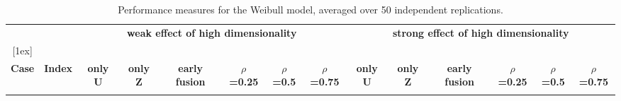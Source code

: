 \begin{table}[!htbp]
\centering
\tiny
\caption{Performance measures for the Weibull model, averaged over 50 independent replications.}
\label{tab:Table2}
\begin{tabular}{c|c|cccccc|cccccc}

\multicolumn{1}{c}{} &
\multicolumn{1}{c}{} &
\multicolumn{6}{c}{\bf weak effect of high dimensionality} &
\multicolumn{6}{c}{\bf strong effect of high dimensionality} \\

[1ex]
\hline

& & & & & & & & & & & & & \\

{\bf Case} &
{\bf Index} &
{\bf only U} &
{\bf only Z} &
{\bf early fusion} &
{\bf $\rho$=0.25} &
{\bf $\rho$=0.5} &
{\bf $\rho$=0.75} &
{\bf only U} &
{\bf only Z} &
{\bf early fusion} &
{\bf $\rho$=0.25} &
{\bf $\rho$=0.5} &
{\bf $\rho$=0.75} \\

& & & & & & & & & & & & & \\


\end{tabular}
\end{table}
